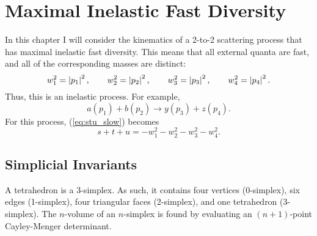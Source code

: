 \chapter{Maximal Inelastic Fast Diversity}
In this chapter I will consider the kinematics of a 2-to-2 scattering process that has maximal inelastic fast diversity. This means that all external quanta are fast, and all of the corresponding masses are distinct:
\begin{equation}
	w_{1}^{2} = \left\lvert p_{1} \right\rvert^{2}, \qquad w_{2}^{2} = \left\lvert p_{2} \right\rvert^{2}, \qquad w_{3}^{2} = \left\lvert p_{3} \right\rvert^{2}, \qquad w_{4}^{2} = \left\lvert p_{4} \right\rvert^{2}.
\end{equation}
Thus, this is an inelastic process. For example,
\begin{equation}
	a(p_{1}) + b(p_{2}) \longrightarrow y(p_{3}) + z(p_{4}).
\end{equation}
For this process, (\ref{eq:stu_slow}) becomes
\begin{equation}
	s + t + u = -w_{1}^{2} - w_{2}^{2} - w_{3}^{2} - w_{4}^{2}.
\end{equation}
\section{Simplicial Invariants}
A tetrahedron is a 3-simplex. As such, it contains four vertices (0-simplex), six edges (1-simplex), four triangular faces (2-simplex), and one tetrahedron (3-simplex). The $n$-volume of an $n$-simplex is found by evaluating an $(n+1)$-point Cayley-Menger determinant. 
